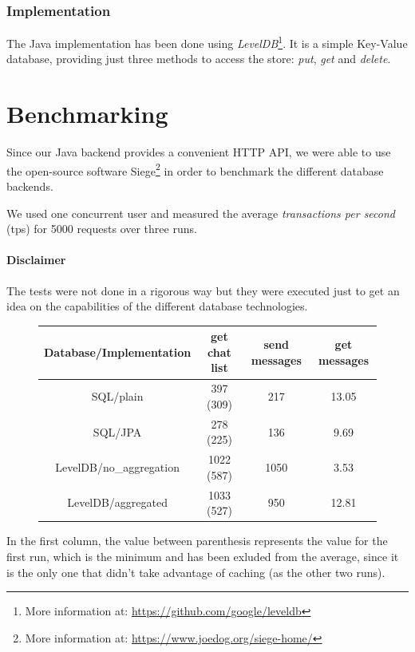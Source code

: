 \documentclass[10pt]{article}
\begin{document}
\subsubsection{Implementation}
The Java implementation has been done using \emph{LevelDB}\footnote{More information
at: \url{https://github.com/google/leveldb}}. It is a simple Key-Value database, 
providing just three methods to access the store: \emph{put}, \emph{get} and 
\emph{delete}.


\section{Benchmarking}
\label{sec:bench}
Since our Java backend provides a convenient HTTP API, we were able to use 
the open-source software Siege\footnote{More information at: 
\url{https://www.joedog.org/siege-home/}} in order to benchmark the different 
database backends. 

We used one concurrent user and measured the average \emph{transactions per second} (tps) for 
5000 requests over three runs.

\paragraph{Disclaimer} 
The tests were not done in a rigorous way but they were executed just to get an 
idea on the capabilities of the different database technologies. 

\begin{figure}[h!]
    \centering
    \begin{tabular}{ | c | c | c | c |}
        \hline
        \textbf{Database/Implementation} & get chat list & send messages & get messages \\\hline
        SQL/plain & 397 (309) & 217 & 13.05 \\\hline
        SQL/JPA & 278 (225) & 136 & 9.69 \\\hline
        LevelDB/no\_aggregation & 1022 (587) & 1050 & 3.53 \\\hline
        LevelDB/aggregated & 1033 (527) & 950 & 12.81 \\\hline
    \end{tabular}
\end{figure}

In the first column, the value between parenthesis represents the value 
for the first run, which is the minimum and has been exluded from the average, 
since it is the only one that didn't take advantage of caching (as the other two runs).
\end{document}

